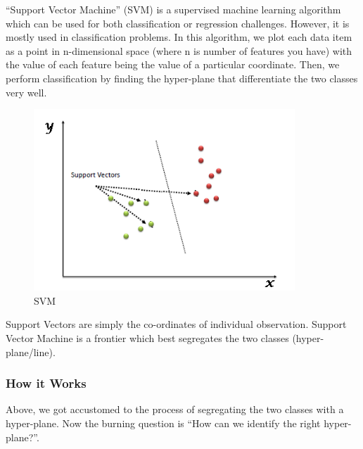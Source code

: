   “Support Vector Machine” (SVM) is a supervised machine learning algorithm which can be used for both classification or regression challenges. However,  it is mostly used in classification problems. In this algorithm, we plot each data item as a point in n-dimensional space (where n is number of features you have) with the value of each feature being the value of a particular coordinate. Then, we perform classification by finding the hyper-plane that differentiate the two classes very well.
  
  
  \begin{figure}[h!]
  \centering
    \includegraphics[scale=0.5]{Figures/svm11.png}
    \caption[SVM]{SVM}
    \label{fig:my_label}
  \end{figure}
  
  Support Vectors are simply the co-ordinates of individual observation. Support Vector Machine is a frontier which best segregates the two classes (hyper-plane/line).
  
  \subsubsection{How it Works}
  
  Above, we got accustomed to the process of segregating the two classes with a hyper-plane. Now the burning question is “How can we identify the right hyper-plane?”.
  
